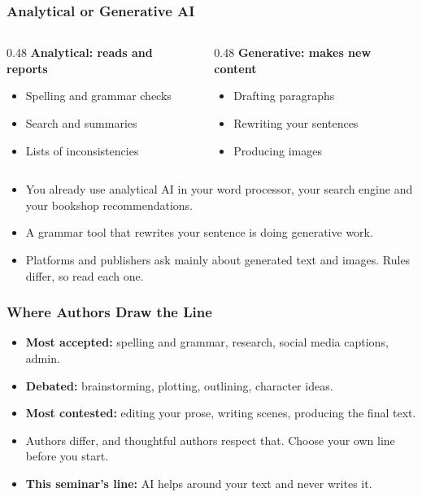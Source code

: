 \begin{frame}[fragile]\frametitle{Analytical or Generative AI}
\begin{columns}
    \begin{column}[T]{0.48\linewidth}
    \textbf{Analytical: reads and reports}
    \begin{itemize}
    \item Spelling and grammar checks
    \item Search and summaries
    \item Lists of inconsistencies
    \end{itemize}
    \end{column}
    \begin{column}[T]{0.48\linewidth}
    \textbf{Generative: makes new content}
    \begin{itemize}
    \item Drafting paragraphs
    \item Rewriting your sentences
    \item Producing images
    \end{itemize}
    \end{column}
\end{columns}
\medskip
\begin{itemize}
\item You already use analytical AI in your word processor, your search engine and your bookshop recommendations.
\item A grammar tool that rewrites your sentence is doing generative work.
\item Platforms and publishers ask mainly about generated text and images. Rules differ, so read each one.
\end{itemize}
\end{frame}

\begin{frame}[fragile]\frametitle{Where Authors Draw the Line}
\begin{itemize}
\item \textbf{Most accepted:} spelling and grammar, research, social media captions, admin.
\item \textbf{Debated:} brainstorming, plotting, outlining, character ideas.
\item \textbf{Most contested:} editing your prose, writing scenes, producing the final text.
\item Authors differ, and thoughtful authors respect that. Choose your own line before you start.
\item \textbf{This seminar's line:} AI helps around your text and never writes it.
\end{itemize}
\end{frame}

